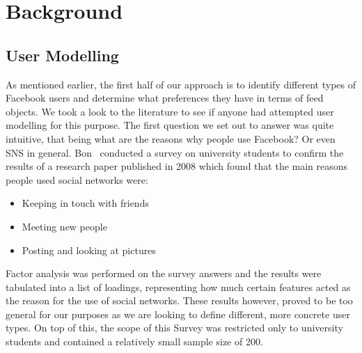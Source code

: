 \chapter{Background}\label{ch:background}


\section{User Modelling}

As mentioned earlier, the first half of our approach is to identify different types of Facebook users and determine what preferences they have in terms of feed objects. We took a look to the literature to see if anyone had attempted user modelling for this purpose.
The first question we set out to answer was quite intuitive, that being what are the reasons why people use Facebook? Or even SNS in general.  Bon~\cite{bonds2010myspace} conducted  a survey on university students to confirm the results of a research paper published in 2008 which found that the main reasons people used social networks were:

\begin{itemize}
 \item Keeping in touch with friends
 \item Meeting new people
 \item Posting and looking at pictures
\end{itemize}


Factor analysis was performed on the survey answers and the results were tabulated into a list of loadings, representing how much certain features acted as the reason for the use of social networks. These results however, proved to be too general for our purposes as we are looking to define different, more concrete user types. On top of this, the scope of this Survey was restricted only to university students and contained a relatively small sample size of 200. 



